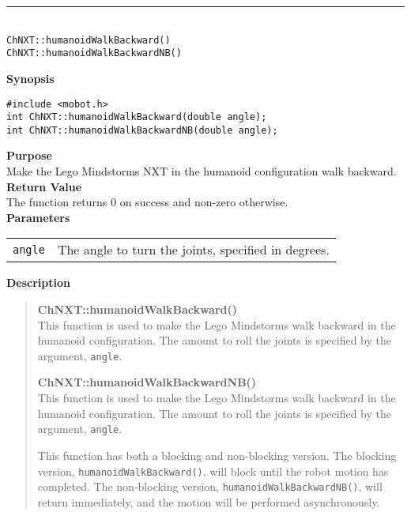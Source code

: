 \noindent
\vspace{5pt}
\rule{4.5in}{0.015in}\\
\noindent
{\LARGE \texttt{ChNXT::humanoidWalkBackward()}}\\
{\LARGE \texttt{ChNXT::humanoidWalkBackwardNB()}}\\
{}

\noindent
{\bf Synopsis}
\begin{lstlisting}
#include <mobot.h>
int ChNXT::humanoidWalkBackward(double angle);
int ChNXT::humanoidWalkBackwardNB(double angle);
\end{lstlisting}

\noindent
{\bf Purpose}\\
Make the Lego Mindstorms NXT in the humanoid configuration walk backward.\\

\noindent
{\bf Return Value}\\
The function returns 0 on success and non-zero otherwise.\\

\noindent
{\bf Parameters}\\
\vspace{-0.1in}
\begin{description}
\item               
\begin{tabular}{p{15 mm}p{145 mm}}
\texttt{angle} & The angle to turn the joints, specified in degrees.\\
\end{tabular}
\end{description}

\noindent
{\bf Description}\\
\vspace{-12pt}
\begin{quote}
{\bf ChNXT::humanoidWalkBackward()}\\
This function is used to make the Lego Mindstorms walk backward in the humanoid
configuration. The amount to roll the joints is specified by the argument,
\texttt{angle}.

{\bf ChNXT::humanoidWalkBackwardNB()}\\
This function is used to make the Lego Mindstorms walk backward in the humanoid
configuration. The amount to roll the joints is specified by the argument,
\texttt{angle}.

This function has both a blocking and non-blocking version.
The blocking version, \texttt{humanoidWalkBackward()}, will block until the
robot motion has completed. The non-blocking version, \texttt{humanoidWalkBackwardNB()},
will return immediately, and the motion will be performed asynchronously.\\
\end{quote}

